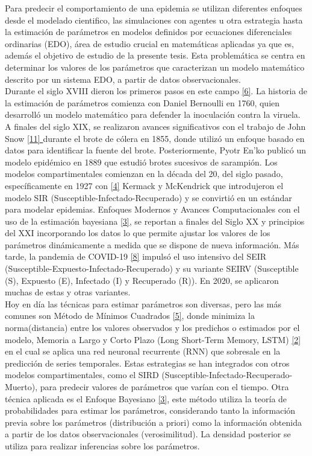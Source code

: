 \documentclass{article}
\begin{document}
Para predecir el comportamiento de una epidemia se utilizan diferentes enfoques desde el modelado cientifico, las simulaciones con agentes u otra estrategia hasta la estimación de parámetros en
modelos definidos por ecuaciones diferenciales ordinarias (EDO), área de estudio crucial en matemáticas aplicadas ya que es, además el objetivo de estudio de la presente tesis. Esta problemática se centra en determinar los valores de los parámetros que caracterizan un modelo matemático descrito por un sistema EDO, a partir de datos observacionales. \\

Durante el siglo XVIII dieron los primeros pasos en este campo \hyperref[sec:6]{[6]}. La historia de la estimación de parámetros comienza con Daniel Bernoulli en 1760, quien desarrolló un modelo matemático para defender la inoculación contra la viruela. A finales del siglo XIX, se realizaron avances significativos con el trabajo de John Snow \hyperref[sec:11]{[11] } durante el brote de cólera en 1855, donde utilizó un enfoque basado en datos para identificar la fuente del brote. Posteriormente, Pyotr En'ko publicó un modelo epidémico en 1889 que estudió brotes sucesivos de sarampión. Los modelos compartimentales comienzan en la década del 20, del siglo pasado, específicamente en 1927 con \hyperref[sec:4]{[4]} Kermack y McKendrick que introdujeron el modelo SIR (Susceptible-Infectado-Recuperado) y se convirtió en un estándar para modelar epidemias. Enfoques Modernos y Avances Computacionales con el uso de la estimación bayesiana \hyperref[sec:3]{[3]}, se reportan a finales del Siglo XX y principios del XXI incorporando los datos lo que permite ajustar los valores de los parámetros dinámicamente a medida que se dispone de nueva información. Más tarde, la pandemia de COVID-19 \hyperref[sec:8]{[8]} impulsó el uso intensivo del SEIR (Susceptible-Expuesto-Infectado-Recuperado) y su variante SEIRV (Susceptible (S), Expuesto (E), Infectado (I) y Recuperado (R)). En 2020, se aplicaron muchas de estas y otras variantes. \\

Hoy en día las técnicas para estimar parámetros son diversas, pero las más comunes son Método de Mínimos Cuadrados \hyperref[sec:5]{ [5]}, donde minimiza la norma(distancia) entre los valores observados y los predichos o estimados por el modelo, Memoria a Largo y Corto Plazo (Long Short-Term Memory, LSTM) \hyperref[sec:2]{ [2]} en el cual se aplica una red neuronal recurrente (RNN) que sobresale en la predicción de series temporales. Estas estrategias se han integrados con otros modelos compartimentales, como el SIRD (Susceptible-Infectado-Recuperado-Muerto), para predecir valores de parámetros que varían con el tiempo. Otra técnica aplicada es el Enfoque Bayesiano \hyperref[sec:3]{[3]}, este método utiliza la teoría de probabilidades para estimar los parámetros, considerando tanto la información previa sobre los parámetros (distribución a priori) como la información obtenida a partir de los datos observacionales (verosimilitud). La densidad posterior se utiliza para realizar inferencias sobre los parámetros. \\
\end{document}
